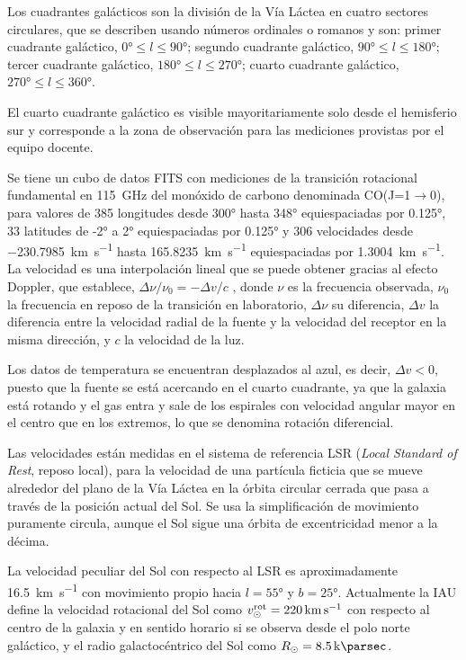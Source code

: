 Los cuadrantes galácticos son la división de la Vía Láctea en cuatro sectores circulares, que se describen usando números ordinales o romanos y son: primer cuadrante galáctico, $\ang{0}\le l\le\ang{90}$; segundo cuadrante galáctico, $\ang{90}\le l\le\ang{180}$; tercer cuadrante galáctico, $\ang{180}\le l\le\ang{270}$; cuarto cuadrante galáctico, $\ang{270}\le l\le\ang{360}$.

El cuarto cuadrante galáctico es visible mayoritariamente solo desde el hemisferio sur y corresponde a la zona de observación para las mediciones provistas por el equipo docente.

Se tiene un cubo de datos FITS con mediciones de la transición rotacional fundamental en \SI{115}{\giga\hertz} del monóxido de carbono denominada CO(J=1$\to$0), para valores de 385 longitudes desde \ang{300} hasta \ang{348} equiespaciadas por \ang{0.125}, 33 latitudes de \ang{-2} a \ang{2} equiespaciadas por \ang{0.125} y 306 velocidades desde \SI{-230.7985}{\kilo\metre\per\second} hasta \SI{165.8235}{\kilo\metre\per\second} equiespaciadas por \SI{1.3004}{\kilo\metre\per\second}. La velocidad es una interpolación lineal que se puede obtener gracias al efecto Doppler, que establece, ${\Delta\nu}/{\nu_0}=-{\Delta v}/{c}$ , donde $\nu$ es la frecuencia observada, $\nu_0$ la frecuencia en reposo de la transición en laboratorio, $\Delta \nu$ su diferencia, $\Delta v$ la diferencia entre la velocidad radial de la fuente y la velocidad del receptor en la misma dirección, y $c$ la velocidad de la luz.

Los datos de temperatura se encuentran desplazados al azul, es decir, $\Delta v<0$, puesto que la fuente se está acercando en el cuarto cuadrante, ya que la galaxia está rotando y el gas entra y sale de los espirales con velocidad angular mayor en el centro que en los extremos, lo que se denomina rotación diferencial.

Las velocidades están medidas en el sistema de referencia LSR (\textit{Local Standard of Rest}, reposo local), para la velocidad de una partícula ficticia que se mueve alrededor del plano de la Vía Láctea en la órbita circular cerrada que pasa a través de la posición actual del Sol. Se usa la simplificación de movimiento puramente circula, aunque el Sol sigue una órbita de excentricidad menor a la décima.

La velocidad peculiar del Sol con respecto al LSR es aproximadamente \SI{16.5}{\kilo\metre\per\second} con movimiento propio hacia $l=\ang{55}$ y $b=\ang{25}$. Actualmente la IAU define la velocidad rotacional del Sol como $v_\odot^{\textnormal{rot}}=\SI{220}{\kilo\metre\per\second}$ con respecto al centro de la galaxia y en sentido horario si se observa desde el polo norte galáctico, y el radio galactocéntrico del Sol como $R_\odot=\SI{8.5}{\kilo\parsec}$.

